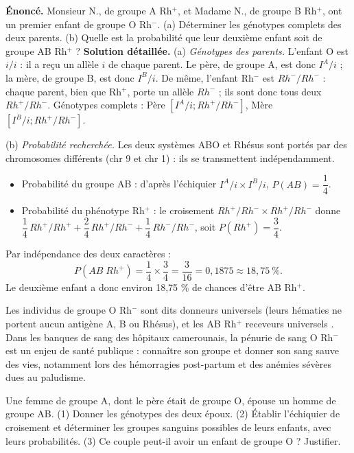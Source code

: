 \documentclass[11pt]{article}
\begin{document}
\begin{exoresolu}
\textbf{Énoncé.} Monsieur N., de groupe A Rh$^{+}$, et Madame N., de groupe B Rh$^{+}$, ont un premier enfant de groupe O Rh$^{-}$. (a) Déterminer les génotypes complets des deux parents. (b) Quelle est la probabilité que leur deuxième enfant soit de groupe AB Rh$^{+}$ ?
\tcblower
\textbf{Solution détaillée.}
(a) \emph{Génotypes des parents.} L'enfant O est $i/i$ : il a reçu un allèle $i$ de chaque parent. Le père, de groupe A, est donc $I^{A}/i$ ; la mère, de groupe B, est donc $I^{B}/i$. De même, l'enfant Rh$^{-}$ est $Rh^{-}/Rh^{-}$ : chaque parent, bien que Rh$^{+}$, porte un allèle $Rh^{-}$ ; ils sont donc tous deux $Rh^{+}/Rh^{-}$.
Génotypes complets : Père $[I^{A}/i ; Rh^{+}/Rh^{-}]$, Mère $[I^{B}/i ; Rh^{+}/Rh^{-}]$.

(b) \emph{Probabilité recherchée.} Les deux systèmes ABO et Rhésus sont portés par des chromosomes différents (chr 9 et chr 1) : ils se transmettent indépendamment.
\begin{itemize}
  \item Probabilité du groupe AB : d'après l'échiquier $I^{A}/i \times I^{B}/i$, $P(AB) = \dfrac{1}{4}$.
  \item Probabilité du phénotype Rh$^{+}$ : le croisement $Rh^{+}/Rh^{-} \times Rh^{+}/Rh^{-}$ donne $\dfrac{1}{4}\,Rh^{+}/Rh^{+} + \dfrac{2}{4}\,Rh^{+}/Rh^{-} + \dfrac{1}{4}\,Rh^{-}/Rh^{-}$, soit $P(Rh^{+}) = \dfrac{3}{4}$.
\end{itemize}
Par indépendance des deux caractères :
\[ P(AB\;Rh^{+}) = \frac{1}{4} \times \frac{3}{4} = \frac{3}{16} = 0{,}1875 \approx 18{,}75\ \%. \]
Le deuxième enfant a donc environ 18,75 \% de chances d'être AB Rh$^{+}$.
\end{exoresolu}

\begin{savaistu}
Les individus de groupe O Rh$^{-}$ sont dits \og donneurs universels \fg{} (leurs hématies ne portent aucun antigène A, B ou Rhésus), et les AB Rh$^{+}$ \og receveurs universels \fg{}. Dans les banques de sang des hôpitaux camerounais, la pénurie de sang O Rh$^{-}$ est un enjeu de santé publique : connaître son groupe et donner son sang sauve des vies, notamment lors des hémorragies post-partum et des anémies sévères dues au paludisme.
\end{savaistu}

\begin{exercice}
Une femme de groupe A, dont le père était de groupe O, épouse un homme de groupe AB. (1) Donner les génotypes des deux époux. (2) Établir l'échiquier de croisement et déterminer les groupes sanguins possibles de leurs enfants, avec leurs probabilités. (3) Ce couple peut-il avoir un enfant de groupe O ? Justifier.
\end{exercice}
\end{document}
